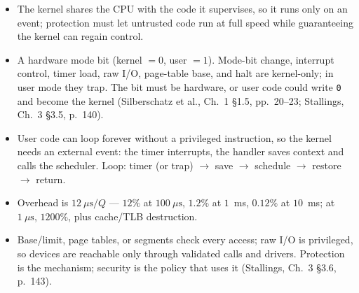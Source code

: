 \documentclass[11pt]{article}
\begin{document}
\begin{itemize}
  \item {} The kernel shares the CPU with the code it supervises, so it runs only on an event; protection must let untrusted code run at full speed while guaranteeing the kernel can regain control.
  \item {} A hardware mode bit (kernel $=0$, user $=1$). Mode-bit change, interrupt control, timer load, raw I/O, page-table base, and halt are kernel-only; in user mode they trap. The bit must be hardware, or user code could write \texttt{0} and become the kernel (Silberschatz et al., Ch.~1 §1.5, pp.~20--23; Stallings, Ch.~3 §3.5, p.~140).
  \item {} User code can loop forever without a privileged instruction, so the kernel needs an external event: the timer interrupts, the handler saves context and calls the scheduler. Loop: timer (or trap) $\to$ save $\to$ schedule $\to$ restore $\to$ return.
  \item {} Overhead is $12\ \mu\text{s}/Q$ --- $12\%$ at $100\ \mu\text{s}$, $1.2\%$ at $1$~ms, $0.12\%$ at $10$~ms; at $1\ \mu\text{s}$, $1200\%$, plus cache/TLB destruction.
  \item {} Base/limit, page tables, or segments check every access; raw I/O is privileged, so devices are reachable only through validated calls and drivers. Protection is the mechanism; security is the policy that uses it (Stallings, Ch.~3 §3.6, p.~143).
\end{itemize}
\end{document}
